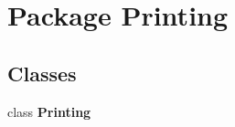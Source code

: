 \section{Package Printing}
\label{namespace_printing}
\subsection*{Classes}
\begin{DoxyCompactItemize}
\item 
class {\bf Printing}
\end{DoxyCompactItemize}
